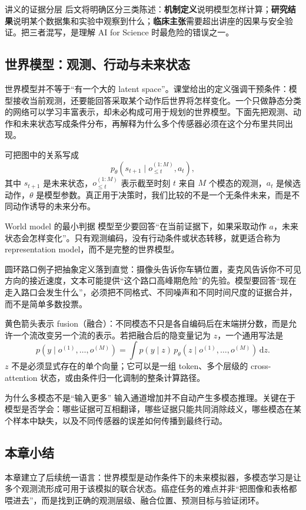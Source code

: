 \begin{importantbox}{讲义的证据分层}
后文将明确区分三类陈述：\textbf{机制定义}说明模型怎样计算；\textbf{研究结果}说明某个数据集和实验中观察到什么；\textbf{临床主张}需要超出讲座的因果与安全验证。把三者混写，是理解 AI for Science 时最危险的错误之一。
\end{importantbox}

\subsection{世界模型：观测、行动与未来状态}

世界模型并不等于“有一个大的 latent space”。课堂给出的定义强调干预条件：模型接收当前观测，还要能回答采取某个动作后世界将怎样变化。一个只做静态分类的网络可以学习丰富表示，却未必构成可用于规划的世界模型。下面先把观测、动作和未来状态写成条件分布，再解释为什么多个传感器必须在这个分布里共同出现。


可把图中的关系写成
\[
p_\theta(s_{t+1}\mid o_{\le t}^{(1:M)},a_t),
\]
其中 $s_{t+1}$ 是未来状态，$o_{\le t}^{(1:M)}$ 表示截至时刻 $t$ 来自 $M$ 个模态的观测，$a_t$ 是候选动作，$\theta$ 是模型参数。真正用于决策时，我们比较的不是一个无条件未来，而是不同动作诱导的未来分布。

\begin{importantbox}{World model 的最小判据}
模型至少要回答“在当前证据下，如果采取动作 $a$，未来状态会怎样变化”。只有观测编码，没有行动条件或状态转移，就更适合称为 representation model，而不是完整的世界模型。
\end{importantbox}


圆环路口例子把抽象定义落到直觉：摄像头告诉你车辆位置，麦克风告诉你不可见方向的接近速度，文本可能提供“这个路口高峰期危险”的先验。模型要回答“现在走入路口会发生什么”，必须把不同格式、不同噪声和不同时间尺度的证据合并，而不是简单多数投票。


黄色箭头表示 fusion（融合）：不同模态不只是各自编码后在末端拼分数，而是允许一个流改变另一个流的表示。若把融合后的隐变量记为 $z$，一个通用写法是
\[
p(y\mid o^{(1)},\ldots,o^{(M)})
=\int p(y\mid z)\,p_\theta(z\mid o^{(1)},\ldots,o^{(M)})\,\mathrm{d}z.
\]
$z$ 不是必须显式存在的单个向量；它可以是一组 token、多个层级的 cross-attention 状态，或由条件归一化调制的整条计算路径。

\begin{knowledgebox}{为什么多模态不是“输入更多”}
输入通道增加并不自动产生多模态推理。关键在于模型是否学会：哪些证据可互相翻译，哪些证据只能共同消除歧义，哪些模态在某个样本中缺失，以及不同传感器的误差如何传播到最终行动。
\end{knowledgebox}

\subsection{本章小结}

本章建立了后续统一语言：世界模型是动作条件下的未来模拟器，多模态学习是让多个观测流形成可用于该模拟的联合状态。癌症任务的难点并非“把图像和表格都喂进去”，而是找到正确的观测层级、融合位置、预测目标与验证闭环。

